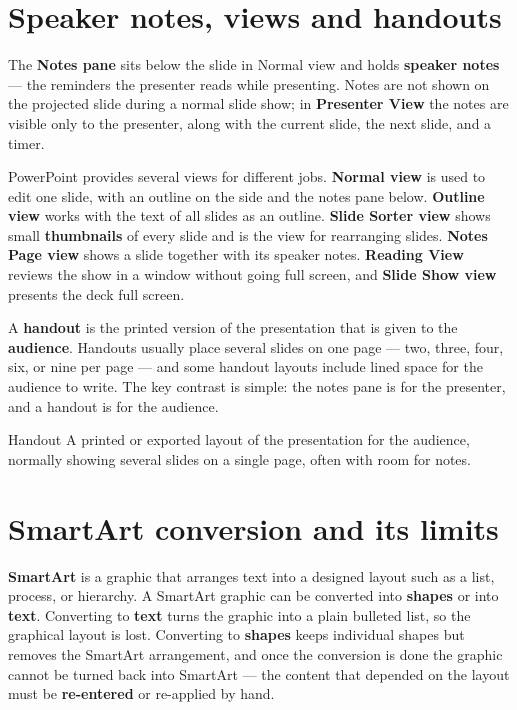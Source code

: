 \section{Speaker notes, views and handouts}
The \textbf{Notes pane} sits below the slide in Normal view and holds
\textbf{speaker notes} --- the reminders the presenter reads while presenting.
Notes are not shown on the projected slide during a normal slide show; in
\textbf{Presenter View} the notes are visible only to the presenter, along with
the current slide, the next slide, and a timer.

PowerPoint provides several views for different jobs. \textbf{Normal view} is
used to edit one slide, with an outline on the side and the notes pane below.
\textbf{Outline view} works with the text of all slides as an outline.
\textbf{Slide Sorter view} shows small \textbf{thumbnails} of every slide and
is the view for rearranging slides. \textbf{Notes Page view} shows a slide
together with its speaker notes. \textbf{Reading View} reviews the show in a
window without going full screen, and \textbf{Slide Show view} presents the
deck full screen.

A \textbf{handout} is the printed version of the presentation that is given to
the \textbf{audience}. Handouts usually place several slides on one page ---
two, three, four, six, or nine per page --- and some handout layouts include
lined space for the audience to write. The key contrast is simple: the notes
pane is for the presenter, and a handout is for the audience.

\begin{definitionbox}{Handout}
A printed or exported layout of the presentation for the audience, normally
showing several slides on a single page, often with room for notes.
\end{definitionbox}

\section{SmartArt conversion and its limits}
\textbf{SmartArt} is a graphic that arranges text into a designed layout such
as a list, process, or hierarchy. A SmartArt graphic can be converted into
\textbf{shapes} or into \textbf{text}. Converting to \textbf{text} turns the
graphic into a plain bulleted list, so the graphical layout is lost. Converting
to \textbf{shapes} keeps individual shapes but removes the SmartArt
arrangement, and once the conversion is done the graphic cannot be turned back
into SmartArt --- the content that depended on the layout must be
\textbf{re-entered} or re-applied by hand.

